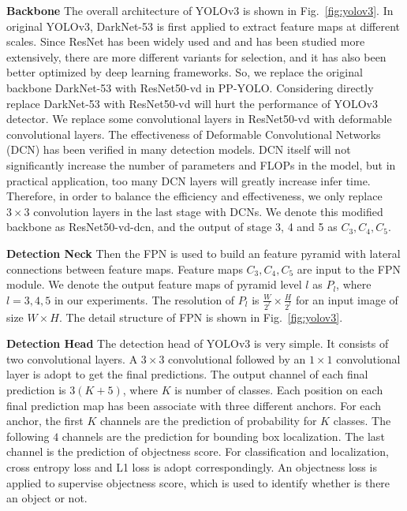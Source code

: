 \documentclass[10pt,twocolumn,letterpaper]{article}
\newcommand{\pheadB}[1] {\vspace{1mm}\noindent\textbf{#1}}
\begin{document}
	\pheadB{Backbone} 
	The overall architecture of YOLOv3 is shown in Fig.~\ref{fig:yolov3}.
	In original YOLOv3\cite{yolov3}, DarkNet-53 is first applied to extract feature maps at different scales. Since ResNet\cite{resnet} has been widely used and and has been studied more extensively, there are more different variants for selection, and it has also been better optimized by deep learning frameworks.
	So, we replace the original backbone DarkNet-53 with ResNet50-vd in PP-YOLO. 
	Considering directly replace DarkNet-53 with ResNet50-vd will hurt the performance of YOLOv3 detector. We replace some convolutional layers in ResNet50-vd with deformable convolutional layers. The effectiveness of Deformable Convolutional Networks (DCN) has been verified in many detection models. DCN itself will not significantly increase the number of parameters and FLOPs in the model, but in practical application, too many DCN layers will greatly increase infer time. Therefore, in order to balance the efficiency and effectiveness, we only replace $3\times3$ convolution layers in the last stage with DCNs. We denote this modified backbone as ResNet50-vd-dcn, and the output of stage 3, 4 and 5 as $C_3, C_4, C_5$.
	
	\pheadB{Detection Neck}
	Then the FPN \cite{fpn} is used to build an feature pyramid with lateral connections between feature maps. Feature maps $C_3, C_4, C_5$ are  input to the FPN module. We denote the output feature maps of pyramid level $l$ as $P_l$, where  $l = 3, 4, 5$ in our experiments. The resolution of $P_l$ is $\frac{W}{2^l} \times \frac{H}{2^l}$ for an input image of size $W \times H$. The detail structure of FPN is shown in Fig.~\ref{fig:yolov3}.  
	
	\pheadB{Detection Head} 
	The detection head of YOLOv3 is very simple. It consists of two convolutional layers. A $3\times3$ convolutional followed by an $1\times1$ convolutional layer is adopt to get the final predictions. The output channel of each final prediction is $3(K+5)$, where $K$ is number of classes. Each position on each final prediction map has been associate with three different anchors. For each anchor, the first $K$ channels are the prediction of probability for $K$ classes. The following $4$ channels are the prediction for bounding box localization. The last channel is the prediction of objectness score. For classification and localization, cross entropy loss and L1 loss is adopt correspondingly. An objectness loss \cite{yolov3} is applied to supervise objectness score, which is used to identify whether is there an object or not. 
	
\end{document}
